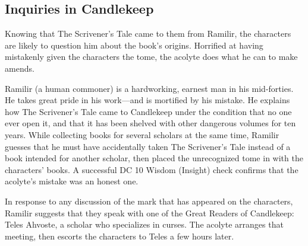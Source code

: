 \documentclass[10pt,a4paper,twoside,bg=print,twocolumn,openany,nodeprecatedcode]{dndbook}
\begin{document}
\subsection{Inquiries in Candlekeep}
Knowing that The Scrivener's Tale came to them from Ramilir, the characters are likely to question him about the book's origins. Horrified at having mistakenly given the characters the tome, the acolyte does what he can to make amends.

Ramilir (a human commoner) is a hardworking, earnest man in his mid-forties. He takes great pride in his work—and is mortified by his mistake. He explains how The Scrivener's Tale came to Candlekeep under the condition that no one ever open it, and that it has been shelved with other dangerous volumes for ten years. While collecting books for several scholars at the same time, Ramilir guesses that he must have accidentally taken The Scrivener's Tale instead of a book intended for another scholar, then placed the unrecognized tome in with the characters' books. A successful DC 10 Wisdom (Insight) check confirms that the acolyte's mistake was an honest one.

In response to any discussion of the mark that has appeared on the characters, Ramilir suggests that they speak with one of the Great Readers of Candlekeep: Teles Ahvoste, a scholar who specializes in curses. The acolyte arranges that meeting, then escorts the characters to Teles a few hours later.
\end{document}
